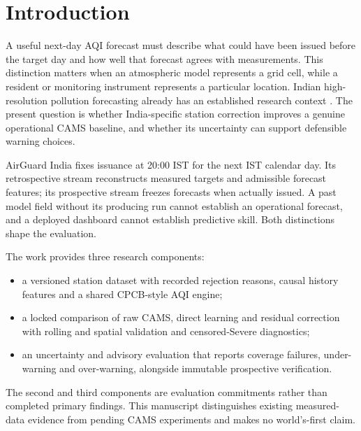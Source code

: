 \section{Introduction}
A useful next-day AQI forecast must describe what could have been issued
before the target day and how well that forecast agrees with measurements.
This distinction matters when an atmospheric model represents a grid cell,
while a resident or monitoring instrument represents a particular location.
Indian high-resolution pollution forecasting already has an established
research context \cite{jena2021delhi}. The present question is whether
India-specific station correction improves a genuine operational CAMS
baseline, and whether its uncertainty can support defensible warning choices.

AirGuard India fixes issuance at 20:00 IST for the next IST calendar day.
Its retrospective stream reconstructs measured targets and admissible
forecast features; its prospective stream freezes forecasts when actually
issued. A past model field without its producing run cannot establish an
operational forecast, and a deployed dashboard cannot establish predictive
skill. Both distinctions shape the evaluation.

The work provides three research components:
\begin{itemize}
\item a versioned station dataset with recorded rejection reasons, causal
history features and a shared CPCB-style AQI engine;
\item a locked comparison of raw CAMS, direct learning and residual
correction with rolling and spatial validation and censored-Severe diagnostics;
\item an uncertainty and advisory evaluation that reports coverage failures,
under-warning and over-warning, alongside immutable prospective verification.
\end{itemize}
The second and third components are evaluation commitments rather than
completed primary findings. This manuscript distinguishes existing measured-data
evidence from pending CAMS experiments and makes no world's-first claim.
